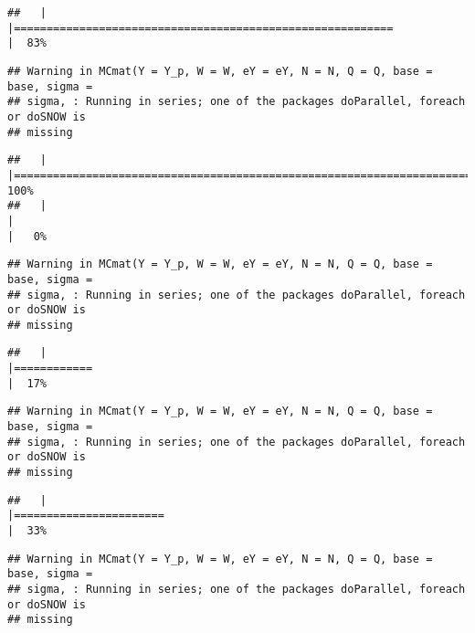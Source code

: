 \documentclass[]{article}
\begin{document}
\begin{verbatim}
##   |                                                                              |==========================================================            |  83%
\end{verbatim}

\begin{verbatim}
## Warning in MCmat(Y = Y_p, W = W, eY = eY, N = N, Q = Q, base = base, sigma =
## sigma, : Running in series; one of the packages doParallel, foreach or doSNOW is
## missing
\end{verbatim}

\begin{verbatim}
##   |                                                                              |======================================================================| 100%
##   |                                                                              |                                                                      |   0%
\end{verbatim}

\begin{verbatim}
## Warning in MCmat(Y = Y_p, W = W, eY = eY, N = N, Q = Q, base = base, sigma =
## sigma, : Running in series; one of the packages doParallel, foreach or doSNOW is
## missing
\end{verbatim}

\begin{verbatim}
##   |                                                                              |============                                                          |  17%
\end{verbatim}

\begin{verbatim}
## Warning in MCmat(Y = Y_p, W = W, eY = eY, N = N, Q = Q, base = base, sigma =
## sigma, : Running in series; one of the packages doParallel, foreach or doSNOW is
## missing
\end{verbatim}

\begin{verbatim}
##   |                                                                              |=======================                                               |  33%
\end{verbatim}

\begin{verbatim}
## Warning in MCmat(Y = Y_p, W = W, eY = eY, N = N, Q = Q, base = base, sigma =
## sigma, : Running in series; one of the packages doParallel, foreach or doSNOW is
## missing
\end{verbatim}
\end{document}
